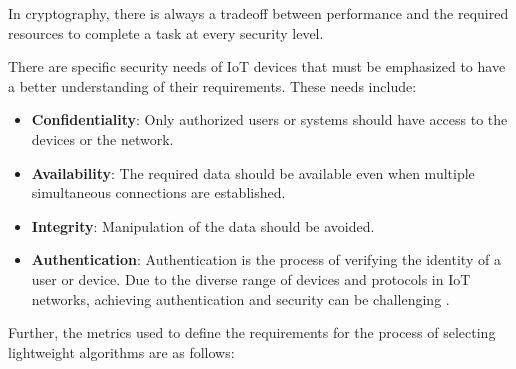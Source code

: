In cryptography, there is always a tradeoff between performance and the required resources to complete a task at every security level.

There are specific security needs of IoT devices that must be emphasized to have a better understanding of their requirements. These needs include:

\begin{itemize}
    \setlength{\itemsep}{-5pt}
    \item \textbf{Confidentiality}: Only authorized users or systems should have access to the devices or the network.
    \item \textbf{Availability}: The required data should be available even when multiple simultaneous connections are established.
    \item \textbf{Integrity}: Manipulation of the data should be avoided.
    \item \textbf{Authentication}: Authentication is the process of verifying the identity of a user or device. Due to the diverse range of devices and protocols in IoT networks, achieving authentication and security can be challenging \cite{dutta2019lightweight} \cite{dhanda2020lightweight}.
\end{itemize}

Further, the metrics used to define the requirements for the process of selecting lightweight algorithms are as follows:

